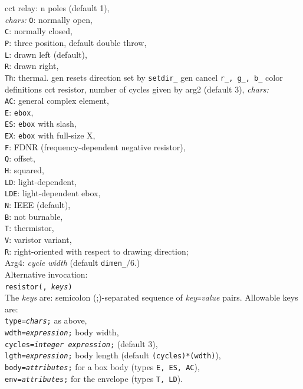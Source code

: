 %
  {cct}%
  {relay: n poles (default 1),\\
    {\sl chars:} {\tt O}: normally open,\\
    {\tt C}: normally closed,\\
    {\tt P}: three position, default double throw,\\
    {\tt L}: drawn left (default),\\
    {\tt R}: drawn right,\\
    {\tt Th}: thermal.}%
%
  {gen}%
  {resets direction set by {\tt setdir\_}}%
%
  {gen}%
  {cancel {\tt r\_, g\_, b\_} color definitions}%
%
  {cct}%
  {resistor, number of cycles given by arg2 (default 3), {\sl chars:}\\
    {\tt AC}: general complex element,\\
    {\tt E}: {\tt ebox},\\
    {\tt ES}: {\tt ebox} with slash,\\
    {\tt EX}: {\tt ebox} with full-size X,\\
    {\tt F}: FDNR (frequency-dependent negative resistor),\\
    {\tt Q}: offset,\\
    {\tt H}: squared,\\
    {\tt LD}: light-dependent,\\
    {\tt LDE}: light-dependent ebox,\\
    {\tt N}: IEEE (default),\\
    {\tt B}: not burnable,\\
    {\tt T}: thermistor,\\
    {\tt V}: varistor variant,\\
    {\tt R}: right-oriented with respect to drawing direction;\\
    Arg4: {\sl cycle width} (default {\tt dimen\_}$/6$.)\\
    Alternative invocation:\\
      {\tt resistor(\linespec, {\sl keys})}\\
    The {\sl keys} are: semicolon (;)-separated sequence of
      {\sl key}{\tt=}{\sl value} pairs.  Allowable keys are:\\
    {\tt type={\sl chars};} as above,\\
    {\tt wdth={\sl expression};} body width,\\
    {\tt cycles={\sl integer expression};} (default 3),\\
    {\tt lgth={\sl expression};} body length (default {\tt (cycles)*(wdth)}),\\
    {\tt body={\sl attributes};} for a box body (types {\tt E, ES, AC}),\\
    {\tt env={\sl attributes};} for the envelope (types {\tt T, LD}).
   \label{resistord}}%
